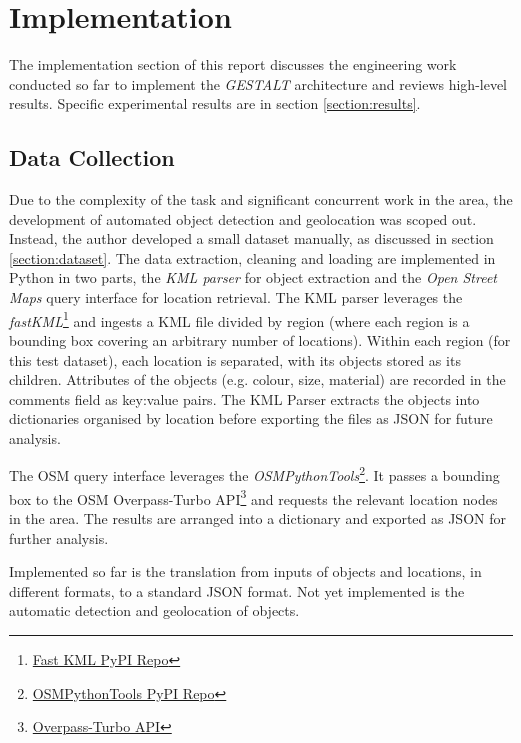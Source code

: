 \section{Implementation}
\label{section:implementation}

The implementation section of this report discusses the engineering work conducted so far to implement the \textit{GESTALT} architecture and reviews high-level results. Specific experimental results are in section \ref{section:results}.

\subsection{Data Collection}
Due to the complexity of the task and significant concurrent work in the area, the development of automated object detection and geolocation was scoped out. 
Instead, the author developed a small dataset manually, as discussed in section \ref{section:dataset}. 
The data extraction, cleaning and loading are implemented in Python in two parts, the \textit{KML parser} for object extraction and the \textit{Open Street Maps} query interface for location retrieval. 
The KML parser leverages the \textit{fastKML}\footnote{\href{https://pypi.org/project/fastkml/}{Fast KML PyPI Repo}} and ingests a KML file divided by region (where each region is a bounding box covering an arbitrary number of locations). 
Within each region (for this test dataset), each location is separated, with its objects stored as its children. 
Attributes of the objects (e.g. colour, size, material) are recorded in the comments field as key:value pairs.
The KML Parser extracts the objects into dictionaries organised by location before exporting the files as JSON for future analysis. 

The OSM query interface leverages the \textit{OSMPythonTools}\footnote{\href{https://pypi.org/project/OSMPythonTools/}{OSMPythonTools PyPI Repo}}. It passes a bounding box to the OSM Overpass-Turbo API\footnote{\href{https://overpass-turbo.eu/}{Overpass-Turbo API}} and requests the relevant location nodes in the area. 
The results are arranged into a dictionary and exported as JSON for further analysis. 

Implemented so far is the translation from inputs of objects and locations, in different formats, to a standard JSON format. Not yet implemented is the automatic detection and geolocation of objects. 

